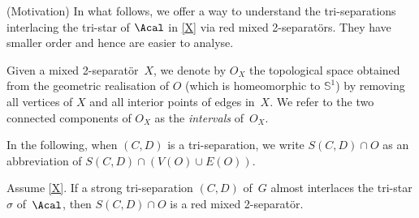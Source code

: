 \documentclass{aic}
\theoremstyle{plain}
\theoremstyle{definition}
\theoremstyle{plain}
\theoremstyle{plain}
\begin{document}
\begin{rem}(Motivation)
    In what follows, we offer a way to understand the tri-separations interlacing the tri-star of $\Acal$ in \autoref{X} via red mixed 2-separat{\"o}rs. 
    They have smaller order and hence are easier to analyse. 
\end{rem}



Given a mixed 2-separat{\"o}r~$X$, we denote by $O_X$ the topological space obtained from the geometric realisation of $O$  (which is homeomorphic to $\mathbb{S}^1$) by removing all vertices of $X$ and all interior points of edges in~$X$. We refer to the two connected components of $O_X$ as the \emph{intervals} of~$O_X$.

In the following, when $(C,D)$ is a tri-separation, we write $S(C,D)\cap O$ as an abbreviation of $S(C,D)\cap (V(O)\cup E(O))$.

\begin{lem}\label{is_red}
Assume \autoref{X}.
    If a strong tri-separation $(C,D)$ of~$G$ almost interlaces the tri-star $\sigma$ of~$\Acal$, then $S(C,D)\cap O$ is a red mixed 2-separat{\"o}r. 
\end{lem}
\end{document}
